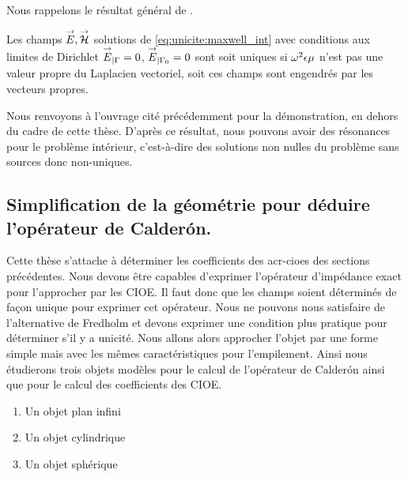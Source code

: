     Nous rappelons le résultat général de \cite[Théorème~8, p.~111]{cessenat_mathematical_1996}.
    \begin{thm}
      Les champs \({\overset{\rightarrow}{E}},{\overset{\rightarrow}{\mathcal{H}}}\) solutions de \eqref{eq:unicite:maxwell_int} avec conditions aux limites de Dirichlet \({\overset{\rightarrow}{E}}_{|\Gamma} = 0\), \({\overset{\rightarrow}{E}}_{|\Gamma_0} = 0\) sont soit uniques si \(\omega^2\epsilon\mu\) n'est pas une valeur propre du Laplacien vectoriel, soit ces champs sont engendrés par les vecteurs propres.
    \end{thm}
    Nous renvoyons à l'ouvrage cité précédemment pour la démonstration, en dehors du cadre de cette thèse.
    D'après ce résultat, nous pouvons avoir des résonances pour le problème intérieur, c'est-à-dire des solutions non nulles du problème sans sources donc non-uniques.


  \subsection{Simplification de la géométrie  pour déduire l'opérateur de Calderón.}
    Cette thèse s'attache à déterminer les coefficients des \glspl{acr-cioe} des sections précédentes.
    Nous devons être capables d'exprimer l'opérateur d'impédance exact pour l'approcher par les CIOE.
    Il faut donc que les champs soient déterminés de façon unique pour exprimer cet opérateur.
    Nous ne pouvons nous satisfaire de l'alternative de Fredholm et devons exprimer une condition plus pratique pour déterminer s'il y a unicité.
    Nous allons alors approcher l'objet par une forme simple mais avec les mêmes caractéristiques pour l'empilement.
    Ainsi nous étudierons trois objets modèles pour le calcul de l'opérateur de Calderón ainsi que pour le calcul des coefficients des CIOE.
    \begin{enumerate}
      \item Un objet plan infini 
      \item Un objet cylindrique
      \item Un objet sphérique
    \end{enumerate}
   
